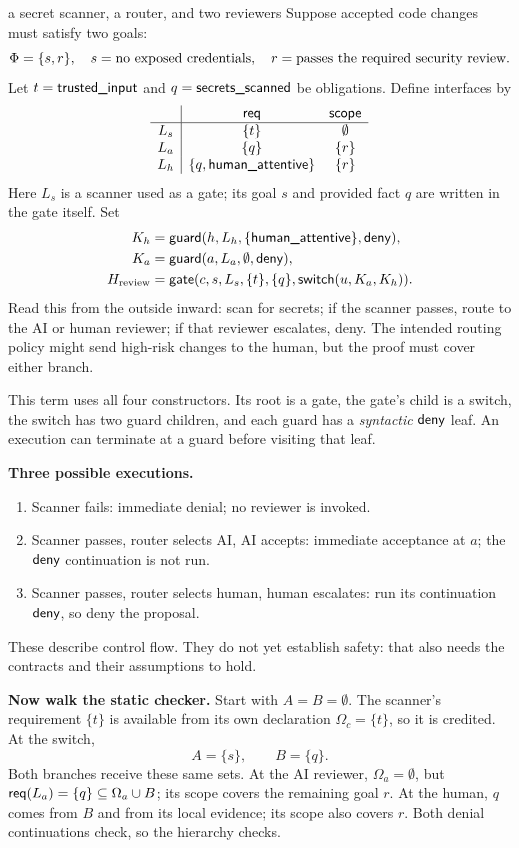 \begin{example}{a secret scanner, a router, and two reviewers}
Suppose accepted code changes must satisfy two goals:
\[
\Phi=\{s,r\},\quad s=\text{no exposed credentials},\quad
r=\text{passes the required security review}.
\]
Let $t=\textsf{trusted\_input}$ and $q=\textsf{secrets\_scanned}$ be obligations. Define interfaces by
\[
\begin{array}{c|cc}
 & \mathsf{req} & \mathsf{scope}\\\hline
L_s & \{t\} & \emptyset\\
L_a & \{q\} & \{r\}\\
L_h & \{q,\textsf{human\_attentive}\} & \{r\}
\end{array}
\]
Here $L_s$ is a scanner used as a gate; its goal $s$ and provided fact $q$ are written in the gate itself. Set
\begin{align*}
K_h &=\mathsf{guard}(h,L_h,\{\textsf{human\_attentive}\},\mathsf{deny}),\\
K_a &=\mathsf{guard}(a,L_a,\emptyset,\mathsf{deny}),\\
H_{\mathrm{review}}
 &=\mathsf{gate}(c,s,L_s,\{t\},\{q\},\mathsf{switch}(u,K_a,K_h)).
\end{align*}
Read this from the outside inward: scan for secrets; if the scanner passes, route to the AI or human reviewer; if that reviewer escalates, deny. The intended routing policy might send high-risk changes to the human, but the proof must cover either branch.

This term uses all four constructors. Its root is a gate, the gate's child is a switch, the switch has two guard children, and each guard has a \emph{syntactic} $\mathsf{deny}$ leaf. An execution can terminate at a guard before visiting that leaf.

\textbf{Three possible executions.}
\begin{enumerate}
\item Scanner fails: immediate denial; no reviewer is invoked.
\item Scanner passes, router selects AI, AI accepts: immediate acceptance at $a$; the $\mathsf{deny}$ continuation is not run.
\item Scanner passes, router selects human, human escalates: run its continuation $\mathsf{deny}$, so deny the proposal.
\end{enumerate}
These describe control flow. They do not yet establish safety: that also needs the contracts and their assumptions to hold.

\textbf{Now walk the static checker.} Start with $A=B=\emptyset$. The scanner's requirement $\{t\}$ is available from its own declaration $\Omega_c=\{t\}$, so it is credited. At the switch,
\[
A=\{s\},\qquad B=\{q\}.
\]
Both branches receive these same sets. At the AI reviewer, $\Omega_a=\emptyset$, but $\mathsf{req}(L_a)=\{q\}\subseteq\Omega_a\cup B$; its scope covers the remaining goal $r$. At the human, $q$ comes from $B$ and  from its local evidence; its scope also covers $r$. Both denial continuations check, so the hierarchy checks.


\end{example}
